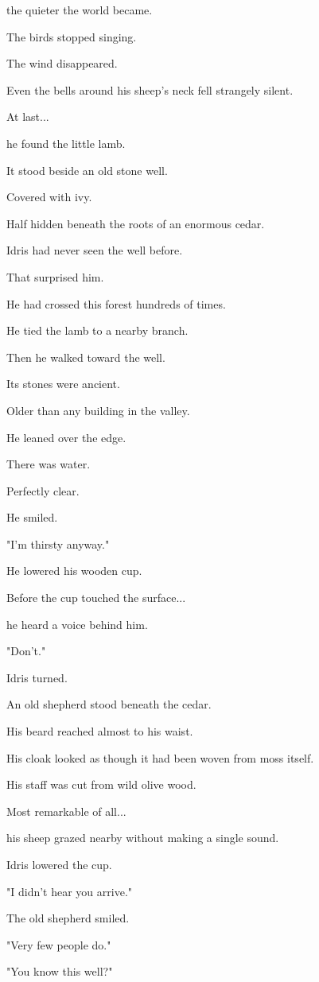 \documentclass[12pt,openany]{book}
\begin{document}
the quieter the world became.

The birds stopped singing.

The wind disappeared.

Even the bells around his sheep's neck fell strangely silent.

At last...

he found the little lamb.

It stood beside an old stone well.

Covered with ivy.

Half hidden beneath the roots of an enormous cedar.

Idris had never seen the well before.

That surprised him.

He had crossed this forest hundreds of times.

He tied the lamb to a nearby branch.

Then he walked toward the well.

Its stones were ancient.

Older than any building in the valley.

He leaned over the edge.

There was water.

Perfectly clear.

He smiled.

"I'm thirsty anyway."

He lowered his wooden cup.

Before the cup touched the surface...

he heard a voice behind him.

"Don't."

Idris turned.

An old shepherd stood beneath the cedar.

His beard reached almost to his waist.

His cloak looked as though it had been woven from moss itself.

His staff was cut from wild olive wood.

Most remarkable of all...

his sheep grazed nearby without making a single sound.

Idris lowered the cup.

"I didn't hear you arrive."

The old shepherd smiled.

"Very few people do."

"You know this well?"
\end{document}
